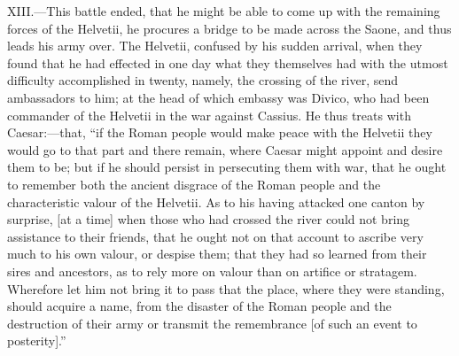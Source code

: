 XIII.—This battle ended, that he might be able to come up with the
remaining forces of the Helvetii, he procures a bridge to be made across
the Saone, and thus leads his army over. The Helvetii, confused by his
sudden arrival, when they found that he had effected in one day what
they themselves had with the utmost difficulty accomplished in twenty,
namely, the crossing of the river, send ambassadors to him; at the head
of which embassy was Divico, who had been commander of the Helvetii in
the war against Cassius. He thus treats with Caesar:—that, ``if the
Roman people would make peace with the Helvetii they would go to that
part and there remain, where Caesar might appoint and desire them to be;
but if he should persist in persecuting them with war, that he ought to
remember both the ancient disgrace of the Roman people and the
characteristic valour of the Helvetii. As to his having attacked one
canton by surprise, [at a time] when those who had crossed the river
could not bring assistance to their friends, that he ought not on that
account to ascribe very much to his own valour, or despise them; that
they had so learned from their sires and ancestors, as to rely more on
valour than on artifice or stratagem. Wherefore let him not bring it to
pass that the place, where they were standing, should acquire a name,
from the disaster of the Roman people and the destruction of their army
or transmit the remembrance [of such an event to posterity].''

